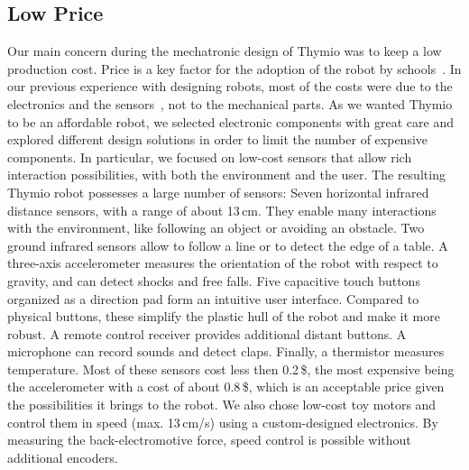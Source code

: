 \documentclass[letterpaper, 10 pt, conference]{ieeeconf}  %
\begin{document}

\subsection{Low Price}

Our main concern during the mechatronic design of Thymio was to keep a low production cost. 
Price is a key factor for the adoption of the robot by schools~\cite{kradolfer2014sociological}.
In our previous experience with designing robots, most of the costs were due to the electronics and the sensors~\cite{thesis_michael}, not to the mechanical parts.
As we wanted Thymio to be an affordable robot, we selected electronic components with great care and explored different design solutions in order to limit the number of expensive components.
In particular, we focused on low-cost sensors that allow rich interaction possibilities, with both the environment and the user.
The resulting Thymio robot possesses a large number of sensors:
Seven horizontal infrared distance sensors, with a range of about 13\,cm.
They enable many interactions with the environment, like following an object or avoiding an obstacle.
Two ground infrared sensors allow to follow a line or to detect the edge of a table.
A three-axis accelerometer measures the orientation of the robot with respect to gravity, and can detect shocks and free falls.
Five capacitive touch buttons organized as a direction pad form an intuitive user interface.
Compared to physical buttons, these simplify the plastic hull of the robot and make it more robust.
A remote control receiver provides additional distant buttons.
A microphone can record sounds and detect claps. 
Finally, a thermistor measures temperature.
Most of these sensors cost less then 0.2\,\$, the most expensive being the accelerometer with a cost of about 0.8\,\$, which is an acceptable price given the possibilities it brings to the robot.
We also chose low-cost toy motors and control them in speed (max. 13\,cm/s) using a custom-designed electronics.
By measuring the back-electromotive force, speed control is possible without additional encoders.
\end{document}
